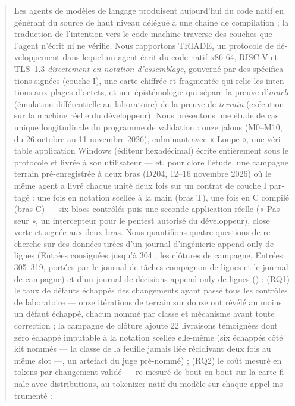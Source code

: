 \documentclass[11pt,a4paper]{article}
\begin{document}
\begin{otherlanguage}{french}
\begin{abstract}
\noindent Les agents de modèles de langage produisent aujourd'hui du code
natif en générant du source de haut niveau délégué à une chaîne de
compilation ; la traduction de l'intention vers le code machine traverse
des couches que l'agent n'écrit ni ne vérifie. Nous rapportons TRIADE, un
protocole de développement dans lequel un agent écrit du code natif
x86-64, RISC-V et TLS~1.3 \emph{directement en notation d'assemblage},
gouverné par des spécifications signées (couche I), une carte chiffrée et
fragmentée qui relie les intentions aux plages d'octets, et une
épistémologie qui sépare la preuve d'\emph{oracle} (émulation
différentielle au laboratoire) de la preuve de \emph{terrain} (exécution
sur la machine réelle du développeur). Nous présentons une étude de cas
unique longitudinale du programme de validation : onze jalons (M0--M10, du
26 octobre au 11 novembre 2026), culminant avec « Loupe », une véritable
application Windows (éditeur hexadécimal) écrite entièrement sous le
protocole et livrée à son utilisateur — et, pour clore l'étude, une
campagne terrain pré-enregistrée à deux bras (D204, 12--16 novembre 2026)
où le même agent a livré chaque unité deux fois sur un contrat de
couche I partagé : une fois en notation scellée à la main (bras T), une
fois en C compilé (bras C) — six blocs contrôlés puis une seconde
application réelle (« Passeur », un intercepteur pour le pentest
autorisé du développeur), close verte et signée aux deux bras. Nous quantifions quatre questions
de recherche sur des données tirées d'un journal d'ingénierie append-only
de \nbLignesJournal{} lignes (Entrées consignées jusqu'à 304 ; les clôtures
de campagne, Entrées 305--319, portées par le journal de tâches
compagnon de \nbLignesWorklog{} lignes et le journal de campagne) et d'un
journal de décisions append-only de \nbLignesDecisions{} lignes
(\plageDecisions) : (RQ1) le taux de défauts échappés des changements ayant
passé tous les contrôles de laboratoire — onze itérations de terrain sur
douze ont révélé au moins un défaut échappé, chacun nommé par classe et
mécanisme avant toute correction ; la campagne de clôture ajoute 22
livraisons témoignées dont zéro échappé imputable à la notation
scellée elle-même (six échappés côté kit nommés — la classe de la
feuille jamais liée récidivant deux fois au même slot —, un artefact
du juge pré-nommé) ; (RQ2) le coût mesuré en tokens par
changement validé — re-mesuré de bout en bout sur la carte finale avec
distributions, au tokenizer natif du modèle sur chaque appel instrumenté :

\end{abstract}
\end{otherlanguage}
\end{document}

